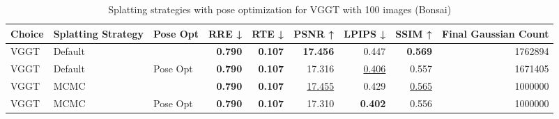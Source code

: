 \begin{table}[H]
\caption{Splatting strategies with pose optimization for VGGT with 100 images (Bonsai)}
\label{tab:09_splatting_strategy_pose_opt_bonsai}
\begin{tabular}{lllrrrrrr}
\toprule
Choice & Splatting Strategy & Pose Opt & RRE ↓ & RTE ↓ & PSNR ↑ & LPIPS ↓ & SSIM ↑ & Final Gaussian Count \\
\midrule
VGGT & Default &  & \textbf{0.790} & \textbf{0.107} & \textbf{17.456} & 0.447 & \textbf{0.569} & 1762894 \\
VGGT & Default & Pose Opt & \textbf{0.790} & \textbf{0.107} & 17.316 & \underline{0.406} & 0.557 & 1671405 \\
VGGT & MCMC &  & \textbf{0.790} & \textbf{0.107} & \underline{17.455} & 0.429 & \underline{0.565} & 1000000 \\
VGGT & MCMC & Pose Opt & \textbf{0.790} & \textbf{0.107} & 17.310 & \textbf{0.402} & 0.556 & 1000000 \\
\bottomrule
\end{tabular}
\end{table}
